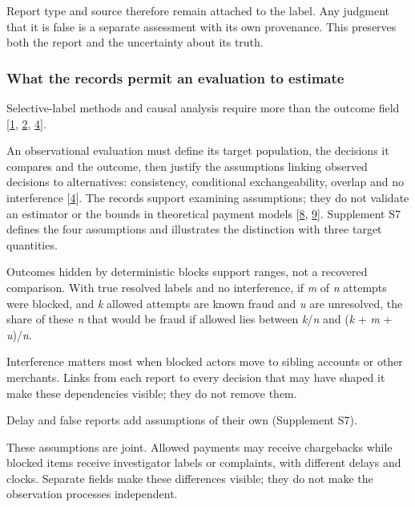 \documentclass[acmlarge,nonacm]{acmart}
\begin{document}
Report type and source therefore remain attached to the label. Any
judgment that it is false is a separate assessment with its own
provenance. This preserves both the report and the uncertainty about its
truth.

\hypertarget{what-the-records-permit-an-evaluation-to-estimate}{%
\subsubsection*{What the records permit an evaluation to
estimate}\label{what-the-records-permit-an-evaluation-to-estimate}}

Selective-label methods and causal analysis require more than the
outcome field {[}\protect\hyperlink{ref-Lakkaraju2017Selective}{1},
\protect\hyperlink{ref-Kilbertus2020Fair}{2},
\protect\hyperlink{ref-HernanRobins2020}{4}{]}.

An observational evaluation must define its target population, the
decisions it compares and the outcome, then justify the assumptions
linking observed decisions to alternatives: consistency, conditional
exchangeability, overlap and no interference
{[}\protect\hyperlink{ref-HernanRobins2020}{4}{]}. The records support
examining assumptions; they do not validate an estimator or the bounds
in theoretical payment models
{[}\protect\hyperlink{ref-Dhama2026Causal}{8},
\protect\hyperlink{ref-Dhama2026Limits}{9}{]}. Supplement S7 defines the
four assumptions and illustrates the distinction with three target
quantities.

Outcomes hidden by deterministic blocks support ranges, not a recovered
comparison. With true resolved labels and no interference, if \emph{m}
of \emph{n} attempts were blocked, and \emph{k} allowed attempts are
known fraud and \emph{u} are unresolved, the share of these \emph{n}
that would be fraud if allowed lies between \emph{k}/\emph{n} and
(\emph{k} + \emph{m} + \emph{u})/\emph{n}.

Interference matters most when blocked actors move to sibling accounts
or other merchants. Links from each report to every decision that may
have shaped it make these dependencies visible; they do not remove them.

Delay and false reports add assumptions of their own (Supplement S7).

These assumptions are joint. Allowed payments may receive chargebacks
while blocked items receive investigator labels or complaints, with
different delays and clocks. Separate fields make these differences
visible; they do not make the observation processes independent.
\end{document}
